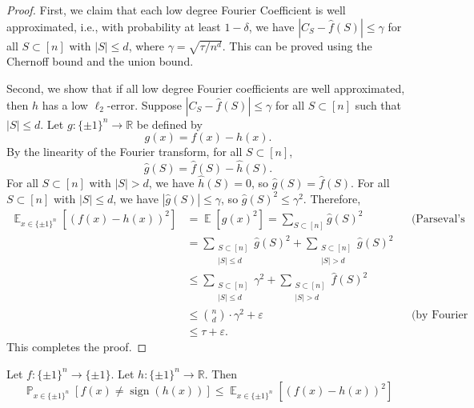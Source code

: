 \documentclass[letterpaper, reqno,11pt]{article}
\newcommand{\RR}{\mathbb{R}}
\newcommand{\PP}{\mathop{{}\mathbb{P}}}
\newcommand{\EE}{\mathop{{}\mathbb{E}}}
\DeclareMathOperator{\sign}{sign}
\begin{document}
\begin{proof}
  First, we claim that each low degree Fourier Coefficient is well approximated, i.e., with probability at least $1 - \delta$, we have $|C_S - \hat{f}(S)| \leq \gamma$ for all $S \subset [n]$ with $|S| \leq d$, where $\gamma = \sqrt{\tau/n^d}$. This can be proved using the Chernoff bound and the union bound.

  Second, we show that if all low degree Fourier coefficients are well approximated, then $h$ has a low $\ell_2$-error. Suppose $|C_S - \hat{f}(S)| \leq \gamma$ for all $S \subset [n]$ such that $|S| \leq d$. Let $g : \{ \pm 1 \}^n \to \RR$ be defined by
  $$ g(x) = f(x) - h(x). $$
  By the linearity of the Fourier transform, for all $S \subset [n]$,
  $$ \hat{g}(S) = \hat{f}(S) - \hat{h}(S). $$
  For all $S \subset [n]$ with $|S| > d$, we have $\hat{h}(S) = 0$, so $\hat{g}(S) = \hat{f}(S)$. For all $S \subset [n]$ with $|S| \leq d$, we have $|\hat{g}(S)| \leq \gamma$, so $\hat{g}(S)^2 \leq \gamma^2$. Therefore,
  \begin{align*}
    \EE_{x \in \{ \pm 1 \}^n}\left[(f(x) - h(x))^2\right] &= \EE\left[g(x)^2\right] = \sum_{S \subset [n]} \hat{g}(S)^2 && \text{(Parseval's identity)} \\
    &= \sum_{\substack{S \subset [n] \\ |S| \leq d}} \hat{g}(S)^2 + \sum_{\substack{S \subset [n] \\ |S| > d}} \hat{g}(S)^2 \\
    &\leq \sum_{\substack{S \subset [n] \\ |S| \leq d}} \gamma^2 + \sum_{\substack{S \subset [n] \\ |S| > d}} \hat{f}(S)^2 \\
    &\leq \binom{n}{d} \cdot \gamma^2 + \varepsilon && \text{(by Fourier concentration)} \\
    &\leq \tau + \varepsilon.
  \end{align*}
  This completes the proof.
\end{proof}

\begin{proposition}
  Let $f : \{ \pm 1 \}^n \to \{ \pm 1 \}$. Let $h : \{ \pm 1 \}^n \to \RR$. Then
  $$ \PP_{x \in \{ \pm 1 \}^n} [f(x) \neq \sign(h(x))] \leq \EE_{x \in \{ \pm 1 \}^n}\left[(f(x) - h(x))^2\right] $$
\end{proposition}
\end{document}
